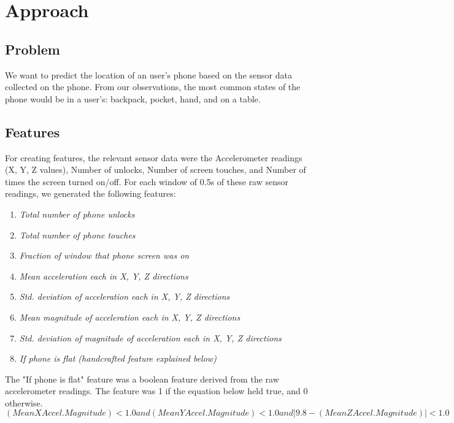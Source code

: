 \section{Approach}

\subsection{Problem}
We want to predict the location of an user's phone based on the sensor data collected on the phone. 
From our observations, the most common states of the phone would be in a user's: backpack, pocket, hand, and on a table. 

\subsection{Features}
For creating features, the relevant sensor data were the Accelerometer readings (X, Y, Z values), Number of unlocks, Number of screen touches, and Number of times the screen turned on/off. For each window of 0.5s of these raw sensor readings, we generated the following features:

\begin{enumerate}
\item \textit{Total number of phone unlocks}
\item \textit{Total number of phone touches}
\item \textit{Fraction of window that phone screen was on}
\item \textit{Mean acceleration each in X, Y, Z directions}
\item \textit{Std. deviation of acceleration each in X, Y, Z directions}
\item \textit{Mean magnitude of acceleration each in X, Y, Z directions}
\item \textit{Std. deviation of magnitude of acceleration each in X, Y, Z directions}
\item \textit{If phone is flat (handcrafted feature explained below)}
\end{enumerate}

The "If phone is flat" feature was a boolean feature derived from the raw accelerometer readings. 
The feature was 1 if the equation below held true, and 0 otherwise.
$$ (Mean X Accel. Magnitude) < 1.0 and (Mean Y Accel. Magnitude ) < 1.0 and |9.8 - (Mean Z Accel. Magnitude)| < 1.0 $$

